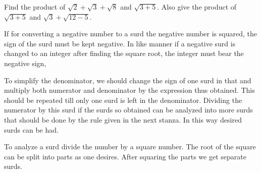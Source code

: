 \documentclass[]{article}
\begin{document}
{{Find the product of $\sqrt{2} + \sqrt{3} + \sqrt{8}$ and $\sqrt{3 + 5}$. Also give
the product of $\sqrt{3 + 5}$ and $\sqrt{3} + \sqrt{12-5}$.}

\begin{quote}  {
}  \end{quote}

{If for converting a negative number to a surd the negative number is
squared, the sign of the surd must be kept negative. In like manner if a
negative surd is changed to an integer after finding the square root,
the integer must bear the negative sign,}

\begin{quote}  {
}  \end{quote}

{To simplify the denominator, we should change the sign of one surd in
that and multiply both numerator and denominator by the expression thus
obtained. This should be repeated till only one surd is left in the
denominator. Dividing the numerator by this surd if the surds so
obtained can be analyzed into more surds that should be done by the rule
given in the next stanza. In this way desired surds can be had.}
\newpage
\large

\begin{quote}  {
}  \end{quote}

{To analyze a surd divide the number by a square number. The root of the
square can be split into parts as one desires. After squaring the parts
we get separate surds.}

}
\end{document}
